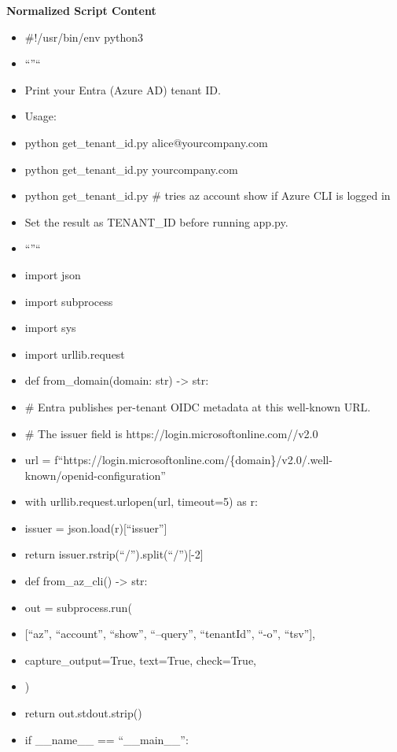 \documentclass[11pt]{article}
\begin{document}
\textbf{Normalized Script Content}
\begin{itemize}[leftmargin=*,itemsep=2pt,topsep=2pt]
\item {} \#!/usr/bin/env python3
\item {} ``''``
\item {} Print your Entra (Azure AD) tenant ID.
\item {} Usage:
\item {} python get\_\allowbreak{}tenant\_\allowbreak{}id.py alice@yourcompany.com
\item {} python get\_\allowbreak{}tenant\_\allowbreak{}id.py yourcompany.com
\item {} python get\_\allowbreak{}tenant\_\allowbreak{}id.py \# tries az account show if Azure CLI is logged in
\item {} Set the result as TENANT\_\allowbreak{}ID before running app.py.
\item {} ``''``
\item {} import json
\item {} import subprocess
\item {} import sys
\item {} import urllib.request
\item {} def from\_\allowbreak{}domain(domain: str) -> str:
\item {} \# Entra publishes per-tenant OIDC metadata at this well-known URL.
\item {} \# The issuer field is https://login.microsoftonline.com//v2.0
\item {} url = f``https://login.microsoftonline.com/\{domain\}/v2.0/.well-known/openid-configuration''
\item {} with urllib.request.urlopen(url, timeout=5) as r:
\item {} issuer = json.load(r)[``issuer'']
\item {} return issuer.rstrip(``/'').split(``/'')[-2]
\item {} def from\_\allowbreak{}az\_\allowbreak{}cli() -> str:
\item {} out = subprocess.run(
\item {} [``az'', ``account'', ``show'', ``--query'', ``tenantId'', ``-o'', ``tsv''],
\item {} capture\_\allowbreak{}output=True, text=True, check=True,
\item {} )
\item {} return out.stdout.strip()
\item {} if \_\allowbreak{}\_\allowbreak{}name\_\allowbreak{}\_\allowbreak{} == ``\_\allowbreak{}\_\allowbreak{}main\_\allowbreak{}\_\allowbreak{}'':

\end{itemize}
\end{document}

